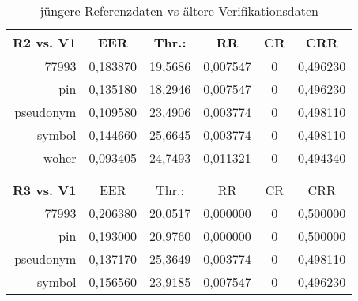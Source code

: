 \begin{table}[htbp]
  \centering
  \caption{j\"ungere Referenzdaten vs \"altere Verifikationsdaten}
    \begin{tabular}{rrrrrr}
    \toprule
    \textbf{R2 vs. V1} & \multicolumn{1}{c}{EER} & \multicolumn{1}{c}{Thr.:} & \multicolumn{1}{c}{RR} & \multicolumn{1}{c}{CR} & \multicolumn{1}{c}{CRR} \\
    \midrule
    77993 & \multicolumn{1}{c}{0,183870} & \multicolumn{1}{c}{19,5686} & \multicolumn{1}{c}{0,007547} & \multicolumn{1}{c}{0} & \multicolumn{1}{c}{0,496230} \\
    pin   & \multicolumn{1}{c}{0,135180} & \multicolumn{1}{c}{18,2946} & \multicolumn{1}{c}{0,007547} & \multicolumn{1}{c}{0} & \multicolumn{1}{c}{0,496230} \\
    pseudonym & \multicolumn{1}{c}{0,109580} & \multicolumn{1}{c}{23,4906} & \multicolumn{1}{c}{0,003774} & \multicolumn{1}{c}{0} & \multicolumn{1}{c}{0,498110} \\
    symbol & \multicolumn{1}{c}{0,144660} & \multicolumn{1}{c}{25,6645} & \multicolumn{1}{c}{0,003774} & \multicolumn{1}{c}{0} & \multicolumn{1}{c}{0,498110} \\
    woher & \multicolumn{1}{c}{0,093405} & \multicolumn{1}{c}{24,7493} & \multicolumn{1}{c}{0,011321} & \multicolumn{1}{c}{0} & \multicolumn{1}{c}{0,494340} \\
          &       &       &       &       &  \\
          &       &       &       &       &  \\
    \textbf{R3 vs. V1} & \multicolumn{1}{c}{EER} & \multicolumn{1}{c}{Thr.:} & \multicolumn{1}{c}{RR} & \multicolumn{1}{c}{CR} & \multicolumn{1}{c}{CRR} \\
    77993 & \multicolumn{1}{c}{0,206380} & \multicolumn{1}{c}{20,0517} & \multicolumn{1}{c}{0,000000} & \multicolumn{1}{c}{0} & \multicolumn{1}{c}{0,500000} \\
    pin   & \multicolumn{1}{c}{0,193000} & \multicolumn{1}{c}{20,9760} & \multicolumn{1}{c}{0,000000} & \multicolumn{1}{c}{0} & \multicolumn{1}{c}{0,500000} \\
    pseudonym & \multicolumn{1}{c}{0,137170} & \multicolumn{1}{c}{25,3649} & \multicolumn{1}{c}{0,003774} & \multicolumn{1}{c}{0} & \multicolumn{1}{c}{0,498110} \\
    symbol & \multicolumn{1}{c}{0,156560} & \multicolumn{1}{c}{23,9185} & \multicolumn{1}{c}{0,007547} & \multicolumn{1}{c}{0} & \multicolumn{1}{c}{0,496230} \\

\end{tabular}
\end{table}
